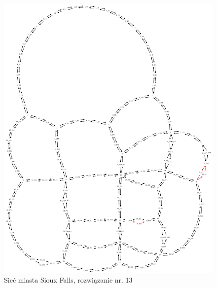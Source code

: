 \documentclass[twoside,12pt]{report}
\begin{document}
\begin{figure}[ht]
\centering
\includegraphics[totalheight=0.580\textheight, angle=90]{img/sioux-out/13/network2}
\caption{Sieć miasta Sioux Falls, rozwiązanie nr. 13}
\label{sioux13}
\end{figure}
\end{document}
